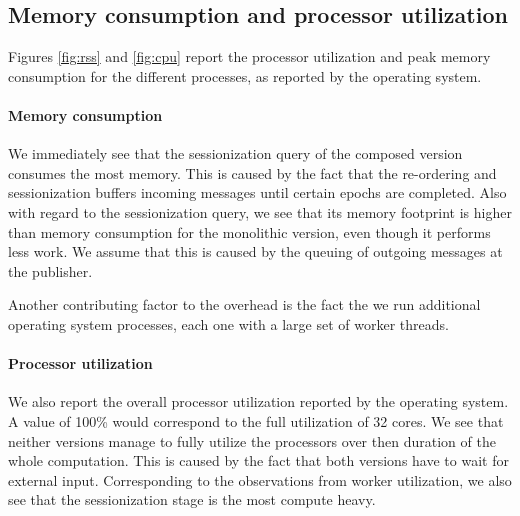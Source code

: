 \subsection{Memory consumption and processor utilization}

Figures \ref{fig:rss} and \ref{fig:cpu} report the processor utilization and peak
memory consumption for the different processes, as reported by the operating
system.

\paragraph{Memory consumption}

We immediately see that the sessionization query of the composed version
consumes the most memory. This is caused by the fact that the re-ordering
and sessionization buffers incoming messages until certain epochs are completed.
Also with regard to the sessionization query, we see that its memory footprint
is higher than memory consumption for the monolithic version, even though
it performs less work. We assume that this is caused by the queuing of
outgoing messages at the publisher.

Another contributing factor to the overhead is the fact the we run additional
operating system processes, each one with a large set of worker threads.


\paragraph{Processor utilization}

We also report the overall processor utilization reported by the operating system.
A value of 100\% would correspond to the full utilization of 32 cores. We see that
neither versions manage to fully utilize the processors over then duration of
the whole computation. This is caused by the fact that both versions have to wait
for external input. Corresponding to the observations from worker utilization, we
also see that the sessionization stage is the most compute heavy.

